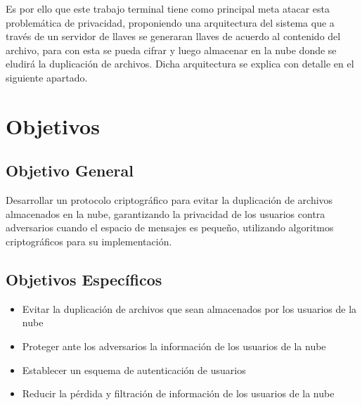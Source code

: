 Es por ello que este trabajo terminal tiene como principal meta atacar esta problemática de privacidad, proponiendo una arquitectura del sistema que a través de un servidor de llaves se generaran llaves de acuerdo al contenido del archivo, para con esta se pueda cifrar y luego almacenar en la nube donde se eludirá la duplicación de archivos. Dicha arquitectura se explica con detalle en el siguiente apartado.

\section{Objetivos} %

    \subsection{Objetivo General} %
    Desarrollar un protocolo criptográfico para evitar la duplicación de archivos almacenados en la nube, garantizando la privacidad de los usuarios contra adversarios cuando el espacio de mensajes es pequeño, utilizando algoritmos criptográficos para su implementación. 
     
    \subsection{Objetivos Específicos} %
	\begin{itemize}
		\item Evitar la duplicación de archivos que sean almacenados por los usuarios de la nube
		\item Proteger ante los adversarios la información de los usuarios de la nube
		\item Establecer un esquema de autenticación de usuarios 
		\item Reducir la pérdida y filtración de información de los usuarios de la nube
 	\end{itemize}
    